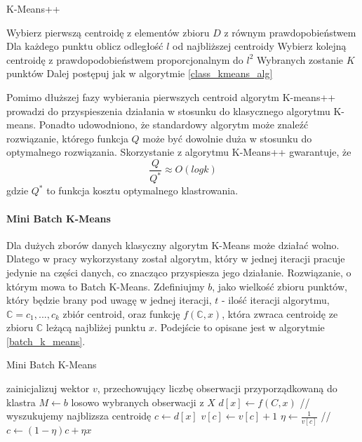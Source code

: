 \documentclass{article}
\begin{document}
\begin{algorithm}
\caption{K-Means++}
\label{k_means++}
\begin{algorithmic}[1]
\STATE Wybierz pierwszą centroidę z elementów zbioru \(D\) z równym prawdopobieństwem
\REPEAT
\STATE Dla każdego punktu oblicz odległość \(l\) od najbliższej centroidy
\STATE Wybierz kolejną centroidę z prawdopodobieństwem proporcjonalnym do \(l^2\)
\UNTIL Wybranych zostanie \(K\) punktów
\STATE Dalej postępuj jak w algorytmie \ref{class_kmeans_alg}
\end{algorithmic}
\end{algorithm}

Pomimo dłuższej fazy wybierania pierwszych centroid algorytm K-means++ prowadzi do przyspieszenia działania w stosunku do klasycznego algorytmu K-means. Ponadto udowodniono, że standardowy algorytm może znaleźć rozwiązanie, którego funkcja \(Q\) może być dowolnie duża w stosunku do optymalnego rozwiązania.
Skorzystanie z algorytmu K-Means++ gwarantuje, że 
\[\frac{Q}{Q^*} \approx O(log k)\]
gdzie \(Q^*\) to funkcja kosztu optymalnego klastrowania. %

\paragraph{Mini Batch K-Means}
Dla dużych zborów danych klasyczny algorytm K-Means może działać wolno. Dlatego w pracy wykorzystany został algorytm, który w jednej iteracji pracuje jedynie na części danych, co znacząco przyspiesza jego działanie\citep{Sculley2010}.
Rozwiązanie, o którym mowa to Batch K-Means.
Zdefiniujmy \(b\), jako wielkość zbioru punktów, który będzie brany pod uwagę w jednej iteracji, \(t\) - ilość iteracji algorytmu, \(\mathbb{C} = {c_1, ..., c_k}\) zbiór centroid, oraz funkcję \(f(\mathbb{C}, x)\), która zwraca centroidę ze zbioru \(\mathbb{C}\) leżącą najbliżej punktu \(x\).
Podejście to opisane jest w algorytmie \ref{batch_k_means}.

\begin{algorithm}
\caption{Mini Batch K-Means}
\label{batch_k_means}
\begin{algorithmic}[1]
\STATE zainicjalizuj wektor $v$, przechowujący liczbę obserwacji przyporządkowaną do 
klastra
	\STATE $M \leftarrow b$ losowo wybranych obserwacji z $X$
		\STATE $d[x] \leftarrow f(C,x)$ // wyszukujemy najblizsza centroidę
	\ENDFOR
		\STATE $c \leftarrow d[x]$
		\STATE $v[c] \leftarrow v[c] + 1$
		\STATE $\eta \leftarrow \frac{1}{v[c]}$ // 
		\STATE $c \leftarrow (1 - \eta)c + \eta x$ 
	\ENDFOR
\ENDFOR
\end{algorithmic}
\end{algorithm}
\FloatBarrier
\end{document}

